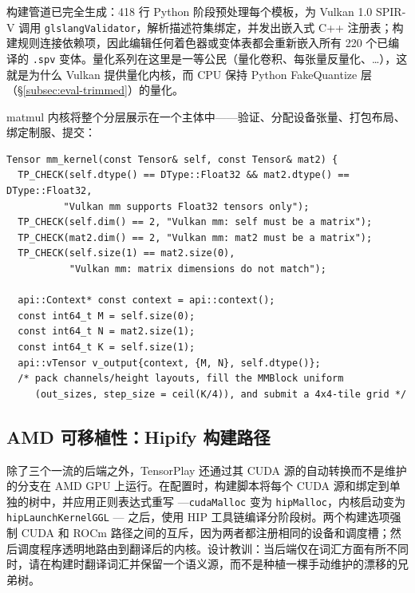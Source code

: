 构建管道已完全生成：418 行 Python 阶段预处理每个模板，为 Vulkan 1.0 SPIR-V 调用 \texttt{glslangValidator}，解析描述符集绑定，并发出嵌入式 C++ 注册表；构建规则连接依赖项，因此编辑任何着色器或变体表都会重新嵌入所有 220 个已编译的 \texttt{.spv} 变体。量化系列在这里是一等公民（量化卷积、每张量反量化、\dots），这就是为什么 Vulkan 提供量化内核，而 CPU 保持 Python FakeQuantize 层（\S\ref{subsec:eval-trimmed}）的量化。

matmul 内核将整个分层展示在一个主体中——验证、分配设备张量、打包布局、绑定制服、提交：

\begin{lstlisting}[caption={Vulkan matmul kernel body: the three-layer pattern (validate $\rightarrow$ \texttt{vTensor} + packing $\rightarrow$ uniform block $\rightarrow$ submit).}, label=lst:vulkanmm]
Tensor mm_kernel(const Tensor& self, const Tensor& mat2) {
  TP_CHECK(self.dtype() == DType::Float32 && mat2.dtype() == DType::Float32,
          "Vulkan mm supports Float32 tensors only");
  TP_CHECK(self.dim() == 2, "Vulkan mm: self must be a matrix");
  TP_CHECK(mat2.dim() == 2, "Vulkan mm: mat2 must be a matrix");
  TP_CHECK(self.size(1) == mat2.size(0),
           "Vulkan mm: matrix dimensions do not match");

  api::Context* const context = api::context();
  const int64_t M = self.size(0);
  const int64_t N = mat2.size(1);
  const int64_t K = self.size(1);
  api::vTensor v_output{context, {M, N}, self.dtype()};
  /* pack channels/height layouts, fill the MMBlock uniform
     (out_sizes, step_size = ceil(K/4)), and submit a 4x4-tile grid */
\end{lstlisting}

\subsection{AMD 可移植性：Hipify 构建路径}
\label{subsec:eval-rocm}

除了三个一流的后端之外，TensorPlay 还通过其 CUDA 源的自动转换而不是维护的分支在 AMD GPU 上运行。在配置时，构建脚本将每个 CUDA 源和绑定到单独的树中，并应用正则表达式重写 ---\texttt{cudaMalloc} 变为 \texttt{hipMalloc}，内核启动变为 \texttt{hipLaunchKernelGGL} --- 之后，使用 HIP 工具链编译分阶段树。两个构建选项强制 CUDA 和 ROCm 路径之间的互斥，因为两者都注册相同的设备和调度槽；然后调度程序透明地路由到翻译后的内核。设计教训：当后端仅在词汇方面有所不同时，请在构建时翻译词汇并保留一个语义源，而不是种植一棵手动维护的漂移的兄弟树。

